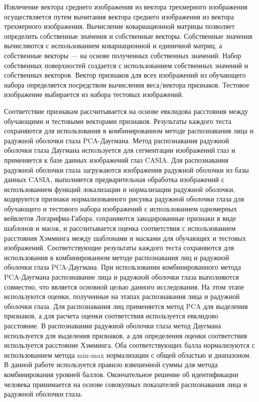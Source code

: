 \begin{multicols}{2}
Извлечение вектора среднего изображения из вектора трехмерного
изображения осуществляется путем вычитания вектора среднего изображения
из вектора трехмерного изображения. Вычисление ковариационной матрицы
позволяет определить собственные значения и собственные векторы.
Собственные значения вычисляются с использованием ковариационной и
единичной матриц, а собственные векторы --- на основе полученных
собственных значений. Набор собственных поверхностей создается с
использованием собственных значений и собственных векторов. Вектор
признаков для всех изображений из обучающего набора определяется
посредством вычисления веса/вектора признаков. Тестовое изображение
выбирается из набора тестовых изображений.

Соответствие признакам рассчитывается на основе евклидова расстояния
между обучающими и тестовыми векторами признаков. Результаты каждого
теста сохраняются для использования в комбинированном методе
распознавания лица и радужной оболочки глаза PCA-Даугмана. Метод
распознавания радужной оболочки глаза Даугмана используется для
сегментации изображений глаз и применяется к базе данных изображений
глаз CASIA. Для распознавания радужной оболочки глаза загружаются
изображения радужной оболочки из базы данных CASIA, выполняется
предварительная обработка изображений с использованием функций
локализации и нормализации радужной оболочки, кодируются признаки
нормализованного рисунка радужной оболочки глаза для обучающего и
тестового набора изображений с использованием одномерных вейвлетов
Логарифма-Габора, сохраняются закодированные признаки в виде шаблонов и
масок, и рассчитывается оценка соответствия с использованием расстояния
Хэмминга между шаблонами и масками для обучающих и тестовых изображений.
Соответствующие результаты каждого теста сохраняются для использования в
комбинированном методе распознавания лиц и радужной оболочки глаза
PCA-Даугмана. При использовании комбинированного метода PCA-Даугмана
распознавание лица и радужной оболочки глаза выполняются совместно, что
является основной целью данного исследования. На этом этапе используются
оценки, полученные на этапах распознавания лица и радужной оболочки
глаза. Для распознавания лиц применяется метод PCA для выделения
признаков, а для расчета оценки соответствия используется евклидово
расстояние. В распознавании радужной оболочки глаза метод Даугмана
используется для выделения признаков, а для определения оценки
соответствия используется расстояние Хэмминга. Оба соответствующих балла
нормализуются с использованием метода min-max нормализации с общей
областью и диапазоном. В данной работе используется правило взвешенной
суммы для метода комбинирования уровней баллов. Окончательное решение об
идентификации человека принимается на основе совокупных показателей
распознавания лица и радужной оболочки глаза.


\end{multicols}
